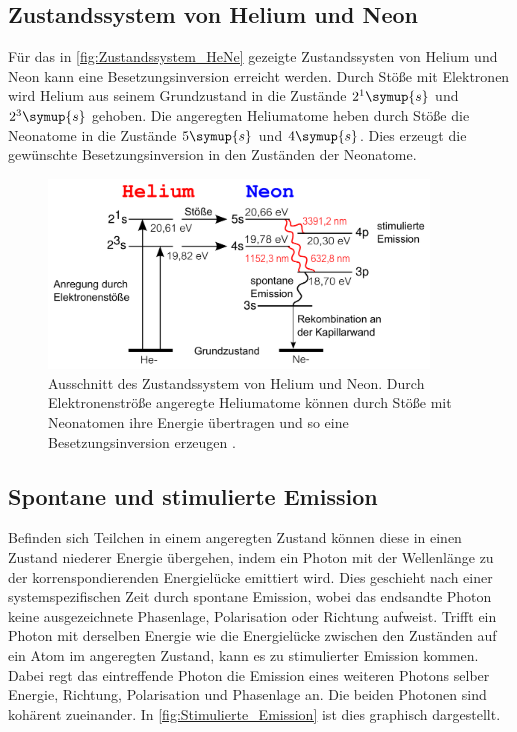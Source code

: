 \subsection{Zustandssystem von Helium und Neon}
Für das in \autoref{fig:Zustandssystem_HeNe} gezeigte Zustandssysten von Helium und Neon kann eine Besetzungsinversion erreicht werden.
Durch Stöße mit Elektronen wird Helium aus seinem Grundzustand in 
die Zustände $2^1\symup{s}$ und $2^3\symup{s}$ gehoben. Die angeregten Heliumatome heben durch Stöße die Neonatome in die Zustände $5\symup{s}$ und $4\symup{s}$.
Dies erzeugt die gewünschte Besetzungsinversion in den Zuständen der Neonatome.

\begin{figure}
    \centering
    \includegraphics[width=0.9\textwidth]{content/pics/Zustandssystem_HeNe.pdf}
    \caption{Ausschnitt des Zustandssystem von Helium und Neon. Durch Elektronenströße angeregte Heliumatome können durch Stöße mit Neonatomen ihre Energie
    übertragen und so eine Besetzungsinversion erzeugen \cite{Zustandssystem_HeNe}.}
    \label{fig:Zustandssystem_HeNe}
\end{figure}

\subsection{Spontane und stimulierte Emission}
Befinden sich Teilchen in einem angeregten Zustand können diese in einen Zustand niederer Energie übergehen, indem ein Photon mit der Wellenlänge zu der korrenspondierenden
Energielücke emittiert wird. Dies geschieht nach einer systemspezifischen Zeit durch spontane Emission, wobei das endsandte Photon keine ausgezeichnete Phasenlage,
Polarisation oder Richtung aufweist.
Trifft ein Photon mit derselben Energie wie die Energielücke zwischen den Zuständen auf ein Atom im angeregten Zustand, kann es zu stimulierter Emission kommen.
Dabei regt das eintreffende Photon die Emission eines weiteren Photons selber Energie, Richtung, Polarisation und Phasenlage an. Die beiden Photonen sind kohärent 
zueinander. In \autoref{fig:Stimulierte_Emission} ist dies graphisch dargestellt.


